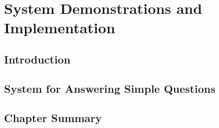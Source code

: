 \chapter{System Demonstrations and Implementation}
\label{ch:demo}

\section{Introduction}
\label{sec:demo:intro}

\section{System for Answering Simple Questions}
\label{sec:demo:simple_qa}


\section{Chapter Summary}
\label{sec:demo:summary}
